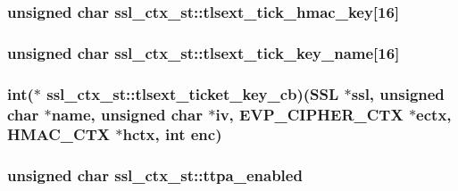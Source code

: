 \hypertarget{structssl__ctx__st_a3bbed4399466da935affa8b11dc37967}{
\subsubsection[{tlsext\-\_\-tick\-\_\-hmac\-\_\-key}]{\setlength{\rightskip}{0pt plus 5cm}unsigned char ssl\-\_\-ctx\-\_\-st\-::tlsext\-\_\-tick\-\_\-hmac\-\_\-key\mbox{[}16\mbox{]}}}\label{structssl__ctx__st_a3bbed4399466da935affa8b11dc37967}
\hypertarget{structssl__ctx__st_a7f5cf468448dbbe1ae706c152d4abee5}{
\subsubsection[{tlsext\-\_\-tick\-\_\-key\-\_\-name}]{\setlength{\rightskip}{0pt plus 5cm}unsigned char ssl\-\_\-ctx\-\_\-st\-::tlsext\-\_\-tick\-\_\-key\-\_\-name\mbox{[}16\mbox{]}}}\label{structssl__ctx__st_a7f5cf468448dbbe1ae706c152d4abee5}
\hypertarget{structssl__ctx__st_a6eb60b719dcca531324468c441147e61}{
\subsubsection[{tlsext\-\_\-ticket\-\_\-key\-\_\-cb}]{\setlength{\rightskip}{0pt plus 5cm}int($\ast$ ssl\-\_\-ctx\-\_\-st\-::tlsext\-\_\-ticket\-\_\-key\-\_\-cb)(S\-S\-L $\ast$ssl, unsigned char $\ast$name, unsigned char $\ast$iv, E\-V\-P\-\_\-\-C\-I\-P\-H\-E\-R\-\_\-\-C\-T\-X $\ast$ectx, H\-M\-A\-C\-\_\-\-C\-T\-X $\ast$hctx, int enc)}}\label{structssl__ctx__st_a6eb60b719dcca531324468c441147e61}
\hypertarget{structssl__ctx__st_a84edac36a312ad1969b43fbd9eebe63a}{
\subsubsection[{ttpa\-\_\-enabled}]{\setlength{\rightskip}{0pt plus 5cm}unsigned char ssl\-\_\-ctx\-\_\-st\-::ttpa\-\_\-enabled}}\label{structssl__ctx__st_a84edac36a312ad1969b43fbd9eebe63a}
